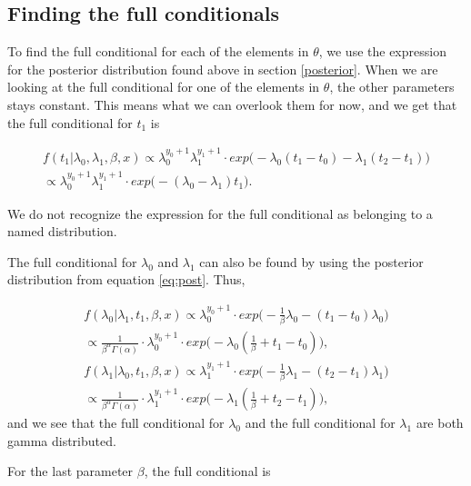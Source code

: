 \subsection{Finding the full conditionals} \label{full_cond}

To find the full conditional for each of the elements in $\theta$, we use the expression for the posterior distribution found above in section \ref{posterior}. When we are looking at the full conditional for one of the elements in $\theta$, the other parameters stays constant. This means what we can overlook them for now, and we get that the full conditional for $t_1$ is

\begin{align}
    f(t_1 | \lambda_0, \lambda_1, \beta, x) \propto 
    \lambda_0^{y_0 + 1} \lambda_1^{y_1 + 1} \cdot exp \Big( -\lambda_0(t_1 - t_0) - \lambda_1 (t_2 - t_1) \Big) \nonumber \\
    \propto  \lambda_0^{y_0 + 1} \lambda_1^{y_1 + 1} \cdot exp \Big( -(\lambda_0 - \lambda_1)t_1 \Big).
\end{align}

We do not recognize the expression for the full conditional as belonging to a named distribution. 

The full conditional for $\lambda_0$ and $\lambda_1$ can also be found by using the posterior distribution from equation \ref{eq:post}. Thus, 

\begin{align}
    f(\lambda_0 | \lambda_1, t_1, \beta, x) \propto
    \lambda_0^{y_0 + 1}\cdot exp \Big( -\frac{1}{\beta} \lambda_0 - (t_1 - t_0)\lambda_0 \Big) 
    \nonumber \\
    \propto \frac{1}{\beta^{\alpha} \Gamma(\alpha)}\cdot \lambda_0^{y_0 + 1} \cdot exp \Big( - \lambda_0 (\frac{1}{\beta} + t_1 - t_0) \Big),
     \\
    f(\lambda_1 | \lambda_0, t_1, \beta, x) \propto
    \lambda_1^{y_1 + 1}\cdot exp \Big( -\frac{1}{\beta} \lambda_1 - (t_2 - t_1)\lambda_1 \Big) \nonumber \\
    \propto \frac{1}{\beta^{\alpha} \Gamma(\alpha)}\cdot \lambda_1^{y_1 + 1} \cdot exp \Big( - \lambda_1 (\frac{1}{\beta} + t_2 - t_1) \Big),
\end{align}
and we see that the full conditional for $\lambda_0$ and the full conditional for $\lambda_1$ are both gamma distributed. 



For the last parameter $\beta$, the full conditional is


